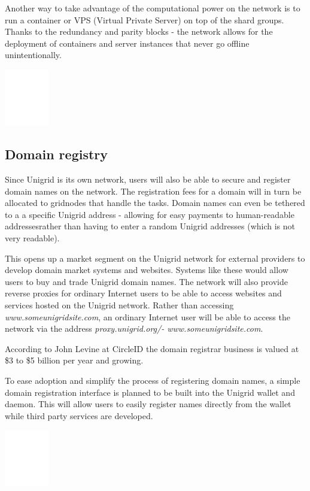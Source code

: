 \documentclass{article}
\begin{document}
Another way to take advantage of the computational power on the network is to run a container or VPS (Virtual Private Server) on top of the shard groups. Thanks to the redundancy and parity blocks - the network allows for the deployment of containers and server instances that never go offline unintentionally.

\begin{center}
\includegraphics[width=55pt]{domain-registry}
\end{center}
\subsection{Domain registry}
Since Unigrid is its own network, users will also be able to secure and register domain names on the network. The registration fees for a domain will in turn be allocated to gridnodes that handle the tasks. Domain names can even be tethered to a a specific Unigrid address - allowing for easy payments to human-readable addressesrather than having to enter a random Unigrid addresses (which is not very readable).

This opens up a market segment on the Unigrid network for external providers to develop domain market systems and websites. Systems like these would allow users to buy and trade Unigrid domain names. The network will also provide reverse proxies for ordinary Internet users to be able to access websites and services hosted on the Unigrid network. Rather than accessing \emph{www.someunigridsite.com}, an ordinary Internet user will be able to access the network via the address \emph{proxy.unigrid.org/- www.someunigridsite.com}.

According to John Levine at CircleID \cite{john2018} the domain registrar business is valued at \$3 to \$5 billion per year and growing.

To ease adoption and simplify the process of registering domain names, a simple domain registration interface is planned to be built into the Unigrid wallet and daemon. This will allow users to easily register names directly from the wallet while third party services are developed.

\begin{center}
\includegraphics[width=55pt]{vpn-connection}
\end{center}
\end{document}
